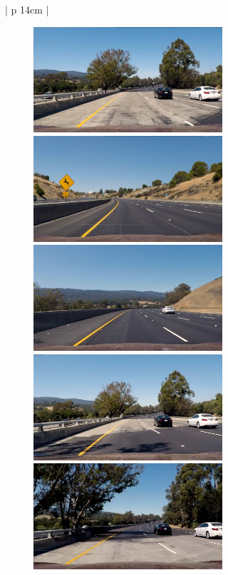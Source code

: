 \begin{table}[H]
	\small
	\begin{adjustbox}{width=1\textwidth}
		\begin{tabular}{| p {14cm} |}
			\hline
			\begin{figure}[H]
				\centering
				{\includegraphics[width = 7cm]{images/test1}} 
				{\includegraphics[width = 7cm]{images/test2}} \\
				{\includegraphics[width = 7cm]{images/test3}}
				{\includegraphics[width = 7cm]{images/test4}}\\
				{\includegraphics[width = 7cm]{images/test5}}

\end{figure}
\end{tabular}
\end{adjustbox}
\end{table}
